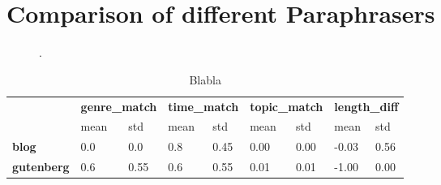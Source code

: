 \section{Comparison of different Paraphrasers}

\begin{figure}[htbp]
    \centering
    
    \caption{.}
    \label{fig:extraction_eval}
\end{figure}

\begin{table}[]
\centering
\caption{Blabla}
\label{tab:extraction_eval_stats}
\begin{tabular}{lllllllll}
\toprule
 &
  \multicolumn{2}{l}{\textbf{genre\_match}} &
  \multicolumn{2}{l}{\textbf{time\_match}} &
  \multicolumn{2}{l}{\textbf{topic\_match}} &
  \multicolumn{2}{l}{\textbf{length\_diff}} \\
\textbf{} & mean & std & mean & std & mean & std & mean & std \\
\midrule
\textbf{blog} &
  0.0 &
  0.0 &
  0.8 &
  0.45 &
  0.00 &
  0.00 &
  -0.03 &
  0.56 \\
\textbf{gutenberg} &
  0.6 &
  0.55 &
  0.6 &
  0.55 &
  0.01 &
  0.01 &
  -1.00 &
  0.00 \\
  \bottomrule
\end{tabular}%
\end{table}